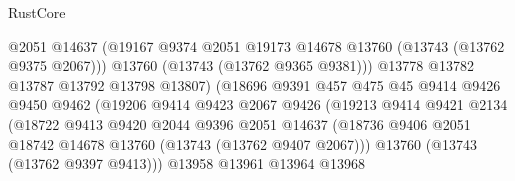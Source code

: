 \begin{lexlean}{RustCore}
\begin{coremodule}
                                      @2051
                                      @14637
                                      (@19167
                                        @9374
                                        @2051
                                        @19173
                                        @14678
                                        @13760
                                        (@13743 (@13762 @9375 @2067)))
                                      @13760
                                      (@13743 (@13762 @9365 @9381)))
                                    @13778
                                    @13782
                                    @13787
                                    @13792
                                    @13798
                                    @13807)
                                  (@18696
                                    @9391
                                    @457
                                    @475
                                    @45
                                    @9414
                                    @9426
                                    @9450
                                    @9462
                                    (@19206
                                      @9414
                                      @9423
                                      @2067
                                      @9426
                                      (@19213
                                        @9414
                                        @9421
                                        @2134
                                        (@18722
                                          @9413
                                          @9420
                                          @2044
                                          @9396
                                          @2051
                                          @14637
                                          (@18736
                                            @9406
                                            @2051
                                            @18742
                                            @14678
                                            @13760
                                            (@13743 (@13762 @9407 @2067)))
                                          @13760
                                          (@13743 (@13762 @9397 @9413)))
                                        @13958
                                        @13961
                                        @13964
                                        @13968

\end{coremodule}
\end{lexlean}

